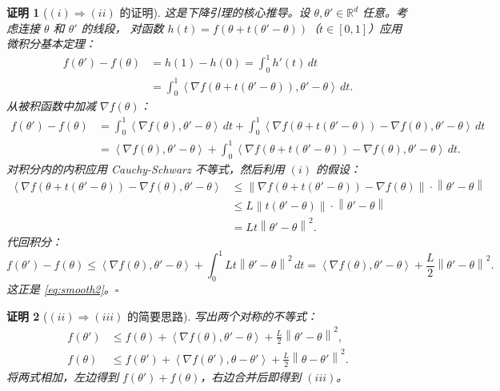 \documentclass[12pt,a4paper]{ctexart}
\theoremstyle{definition}
\theoremstyle{plain}
\newtheorem*{proof*}{证明}
\newcommand{\R}{\mathbb{R}}
\newcommand{\grad}{\nabla}
\newcommand{\norm}[1]{\left\lVert #1 \right\rVert}
\newcommand{\ip}[2]{\left\langle #1,#2 \right\rangle}
\begin{document}
\begin{proof*}[$(i) \Rightarrow (ii)$ 的证明]
  这是下降引理的核心推导。设 $\theta, \theta' \in \R^d$ 任意。考虑连接 $\theta$ 和 $\theta'$ 的线段，
  对函数 $h(t) = f(\theta + t(\theta' - \theta))$（$t \in [0,1]$）应用微积分基本定理：
  \begin{equation}\label{eq:fundamental}
    \begin{aligned}
      f(\theta') - f(\theta) &= h(1) - h(0) = \int_0^1 h'(t)\,dt \\
      &= \int_0^1 \ip{\grad f(\theta + t(\theta' - \theta))}{\theta' - \theta}\,dt.
    \end{aligned}
  \end{equation}
  从被积函数中加减 $\grad f(\theta)$：
  \begin{equation}
    \begin{aligned}
      f(\theta') - f(\theta) &= \int_0^1 \ip{\grad f(\theta)}{\theta' - \theta}\,dt
        + \int_0^1 \ip{\grad f(\theta + t(\theta' - \theta)) - \grad f(\theta)}{\theta' - \theta}\,dt \\[4pt]
      &= \ip{\grad f(\theta)}{\theta' - \theta}
        + \int_0^1 \ip{\grad f(\theta + t(\theta' - \theta)) - \grad f(\theta)}{\theta' - \theta}\,dt.
    \end{aligned}
  \end{equation}
  对积分内的内积应用 Cauchy-Schwarz 不等式，然后利用 $(i)$ 的假设：
  \begin{equation}
    \begin{aligned}
      \ip{\grad f(\theta + t(\theta' - \theta)) - \grad f(\theta)}{\theta' - \theta}
      &\le \norm{\grad f(\theta + t(\theta' - \theta)) - \grad f(\theta)} \cdot \norm{\theta' - \theta} \\[4pt]
      &\le L \norm{t(\theta' - \theta)} \cdot \norm{\theta' - \theta} \\[4pt]
      &= L t \norm{\theta' - \theta}^2.
    \end{aligned}
  \end{equation}
  代回积分：
  \begin{equation}
    f(\theta') - f(\theta) \le \ip{\grad f(\theta)}{\theta' - \theta} + \int_0^1 L t \norm{\theta' - \theta}^2\,dt
    = \ip{\grad f(\theta)}{\theta' - \theta} + \frac{L}{2} \norm{\theta' - \theta}^2.
  \end{equation}
  这正是 \eqref{eq:smooth2}。$\square$
\end{proof*}

\begin{proof*}[$(ii) \Rightarrow (iii)$ 的简要思路]
  写出两个对称的不等式：
  \begin{align*}
    f(\theta') &\le f(\theta) + \ip{\grad f(\theta)}{\theta' - \theta} + \frac{L}{2}\norm{\theta' - \theta}^2, \\
    f(\theta) &\le f(\theta') + \ip{\grad f(\theta')}{\theta - \theta'} + \frac{L}{2}\norm{\theta - \theta'}^2.
  \end{align*}
  将两式相加，左边得到 $f(\theta') + f(\theta)$，右边合并后即得到 $(iii)$。
\end{proof*}
\end{document}
